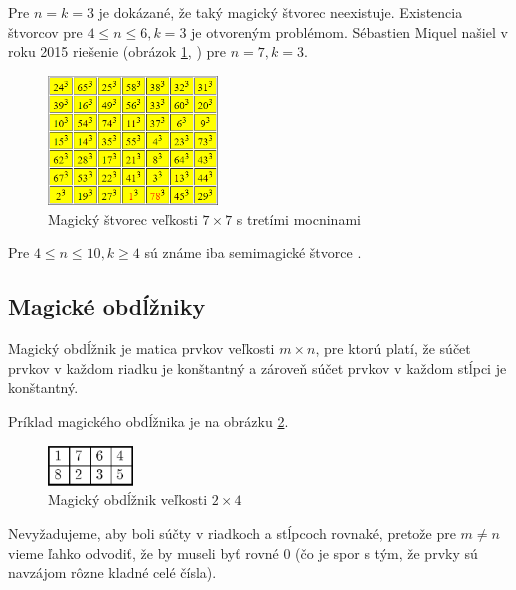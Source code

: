 Pre $n = k = 3$ je dokázané, že taký magický štvorec neexistuje. Existencia štvorcov pre $4 \leq n \leq 6, k = 3$ je otvoreným problémom. Sébastien Miquel našiel v roku 2015 riešenie (obrázok \ref{obr:fig_miquel_magic_7x7}, \cite{multimagie}) pre $n = 7, k = 3$.

\begin{figure}[H]
\centerline{\includegraphics[width=0.4\textwidth]{images/miquel_magic_7x7}}
\caption[Magický štvorec veľkosti $7 \times 7$ s tretími mocninami]{Magický štvorec veľkosti $7 \times 7$ s tretími mocninami \cite{multimagie}}
\label{obr:fig_miquel_magic_7x7}
\end{figure}

Pre $4 \leq n \leq 10, k \geq 4$ sú známe iba semimagické štvorce \cite{multimagie}. \\

\subsection{Magické obdĺžniky}
\begin{definition} Magický obdĺžnik je matica prvkov veľkosti $m \times n$, pre ktorú platí, že súčet prvkov v každom riadku je konštantný a zároveň súčet prvkov v každom stĺpci je konštantný.
\end{definition}

Príklad magického obdĺžnika je na obrázku \ref{obr:fig_trenkler_magic_2x4}.

\begin{figure}[H]
\centerline{\includegraphics[width=0.2\textwidth]{images/trenkler_magic_2x4}}
\caption[Magický obdĺžnik veľkosti $2 \times 4$]{Magický obdĺžnik veľkosti $2 \times 4$ \cite{rectangles}}
\label{obr:fig_trenkler_magic_2x4}
\end{figure}

Nevyžadujeme, aby boli súčty v riadkoch a stĺpcoch rovnaké, pretože pre $m \neq n$ vieme ľahko odvodiť, že by museli byť rovné $0$ (čo je spor s tým, že prvky sú navzájom rôzne kladné celé čísla). \\

